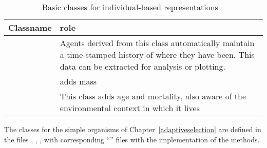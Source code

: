 \begin{table}[H]
\begin{center}
  \caption{Basic classes for individual-based rep\-re\-senta\-tions
  -- \label{classtable3}} 
  \begin{tabular}{l L{7cm}}
    \toprule 
    \textbf{Classname} & \textbf{role} \\
    \midrule
     & Agents derived from this class automatically
    maintain a time-stamped history of where they have been. This data
    can be extracted for analysis or plotting.\\
     & adds mass \\
     & This class adds age and mortality, also aware of the
    environmental context in which it lives \\
    \bottomrule
\end{tabular}
\end{center}
\end{table}

The classes for the simple organisms of
Chapter~\ref{adaptiveselection} are defined in the files
, ,
, with corresponding
``'' files with the implementation of the methods.

